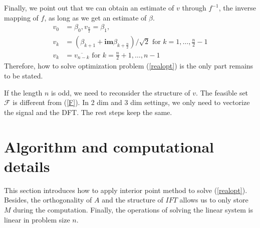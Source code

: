 \documentclass[final,onefignum,onetabnum]{siamart190516}
\begin{document}
Finally, we point out that we can obtain an estimate of $v$ through $f^{-1}$, the inverse mapping of $f$, as long as we get an estimate of $\beta$.
\begin{equation}
\begin{aligned}
    v_0 &= \beta_0, v_{\frac{n}{2}} = \beta_1, \\
    v_k &= (\beta_{k+1}+\textbf{im}\beta_{k+\frac{n}{2}})/\sqrt{2}\text{ for }k=1,\dots,\frac{n}{2}-1\\
    v_{k} &= \overline{v_{n-k}}\text{ for }k=\frac{n}{2}+1,\dots,n-1
\end{aligned}
\end{equation}
Therefore, how to solve optimization problem (\ref{realopt}) is the only part remains to be stated.

\begin{remark}
If the length $n$ is odd, we need to reconsider the structure of $v$. The feasible set $\mathcal{F}$ is different from (\ref{F}). In 2 dim and 3 dim settings, we only need to vectorize the signal and the DFT. The rest steps keep the same.
\end{remark}

\section{Algorithm and computational details}\label{sec:algorithm}
This section introduces how to apply interior point method to solve (\ref{realopt}). Besides, the orthogonality of $A$ and the structure of $IFT$ allows us to only store $M$ during the computation. Finally, the operations of solving the linear system is linear in problem size $n$. 
\end{document}
